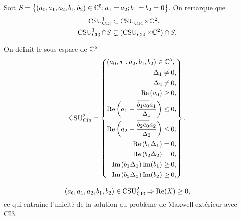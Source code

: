   Soit \(S = \left\lbrace (a_0,a_1,a_2,b_1,b_2) \in \CC^5 ; a_1 = a_2 ; b_1 = b_2 = 0 \right\rbrace \). On remarque que
  \begin{align}
    \CSU[1]{CI3} & \subset \CSU{CI4}\times\CC^2,
    \\
    \CSU[1]{CI3}\cap S & \subsetneq (\CSU{CI4}\times\CC^2)\cap S.
  \end{align}

  \begin{defn}
    \label{def:csu:ci3-2}

    On définit le sous-espace de \(\CC^5\)
    \begin{equation*}
      \CSU[2]{CI3} = \left\lbrace 
      \begin{aligned}
      &(a_0,a_1,a_2,b_1,b_2) \in \CC^5,
      \\
      &\begin{aligned}
        \Delta_1 &\not = 0,
        \\
        \Delta_2 &\not = 0,
        \\
        \Re\left(a_0\right)&\ge 0,
        \\
        \Re\left(a_1 - \frac{\conj{b_1a_0}a_1}{\Delta_1}\right) &\le 0,
        \\
        \Re\left(a_2 - \frac{\conj{b_2a_0}a_2}{\Delta_2}\right) &\le 0,
        \\
        \Re\left(b_1\Delta_1\right) &= 0,
        \\
        \Re\left(b_2\Delta_2\right) &= 0,
        \\
        \Im\left(b_1\Delta_1\right)\Im(b_1)&\ge 0,
        \\
        \Im\left(b_2\Delta_2\right)\Im(b_2)&\ge 0,
        \end{aligned}
      \end{aligned}
      \right\rbrace.
    \end{equation*}
  \end{defn}

 \begin{prop}
    \label{prop:csu:ci3-2}
    \begin{equation*}
      (a_0,a_1,a_2,b_1,b_2) \in \CSU[2]{CI3} \Rightarrow \Re(X) \ge 0,
    \end{equation*}
    ce qui entraîne l'unicité de la solution du problème de Maxwell extérieur avec CI3.
  \end{prop}

